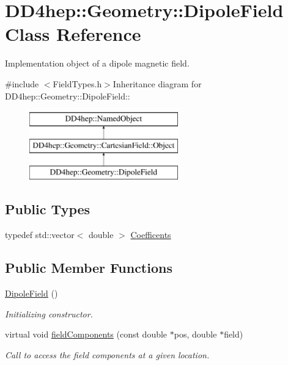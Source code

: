 \hypertarget{class_d_d4hep_1_1_geometry_1_1_dipole_field}{
\section{DD4hep::Geometry::DipoleField Class Reference}
\label{class_d_d4hep_1_1_geometry_1_1_dipole_field}
}


Implementation object of a dipole magnetic field.  


{\ttfamily \#include $<$FieldTypes.h$>$}Inheritance diagram for DD4hep::Geometry::DipoleField::\begin{figure}[H]
\begin{center}
\leavevmode
\includegraphics[height=3cm]{class_d_d4hep_1_1_geometry_1_1_dipole_field}
\end{center}
\end{figure}
\subsection*{Public Types}
\begin{DoxyCompactItemize}
\item 
typedef std::vector$<$ double $>$ \hyperlink{class_d_d4hep_1_1_geometry_1_1_dipole_field_a0e17be76b199f0f144624e6a5eb1f030}{Coefficents}
\end{DoxyCompactItemize}
\subsection*{Public Member Functions}
\begin{DoxyCompactItemize}
\item 
\hyperlink{class_d_d4hep_1_1_geometry_1_1_dipole_field_a7a431d40e83bd52565fccf2ed507780e}{DipoleField} ()
\begin{DoxyCompactList}\small\item\em Initializing constructor. \item\end{DoxyCompactList}\item 
virtual void \hyperlink{class_d_d4hep_1_1_geometry_1_1_dipole_field_afee57d23345cdd6a457475d8fe6ac4a7}{fieldComponents} (const double $\ast$pos, double $\ast$field)
\begin{DoxyCompactList}\small\item\em Call to access the field components at a given location. \item\end{DoxyCompactList}\end{DoxyCompactItemize}
